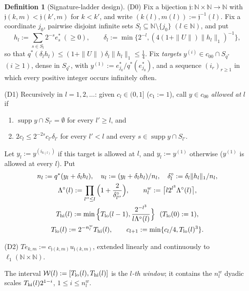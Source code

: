 \documentclass[10pt]{amsart}
\theoremstyle{definition}
\newtheorem{definition}[theorem]{Definition}
\theoremstyle{remark}
\newcommand{\supp}{\operatorname{supp}}
\newcommand{\N}{\mathbb N}
\begin{document}
\begin{definition}[Signature-ladder design]\label{def:SLD}
\textup{(D0)} Fix a bijection $\mathfrak j:\N\times\N\to\N$ with
$\mathfrak j(k,m)<\mathfrak j(k',m)$ for $k<k'$, and write $(k(l),m(l)):=\mathfrak j^{-1}(l)$.
Fix a coordinate $j_0$, pairwise disjoint infinite sets
$S_l\subseteq\N\setminus\{j_0\}$ $(l\in\N)$, and put
\[
 h_l:=\sum_{s\in S_l}2^{-s}e_s^*\ (\ge0),\qquad \delta_l:=\min\big\{2^{-l},
 (4(1+\|U\|)\|h_l\|_1)^{-1}\big\},
\]
so that $q^*(\delta_lh_l)\le(1+\|U\|)\delta_l\|h_l\|_1\le\frac14$.  Fix
\emph{targets} $y^{(i)}\in c_{00}\cap S_{q^*}$ $(i\ge1)$, dense in
$S_{q^*}$, with $y^{(1)}:=e_{j_0}^*/q^*(e_{j_0}^*)$, and a sequence
$(i_r)_{r\ge1}$ in which every positive integer occurs infinitely often.

\textup{(D1)} Recursively in $l=1,2,\dots$: given $c_l\in(0,1]$ ($c_1:=1$),
call $y\in c_{00}$ \emph{allowed at} $l$ if
\begin{enumerate}
\item[(a)] $\supp y\cap S_{l'}=\emptyset$ for every $l'\ge l$, and
\item[(b)] $2c_l\le2^{-2s}c_{l'}\delta_{l'}$ for every $l'<l$ and every
$s\in\supp y\cap S_{l'}$.
\end{enumerate}
Let $y_l:=y^{(i_{k(l)})}$ if this target is allowed at $l$, and
$y_l:=y^{(1)}$ otherwise ($y^{(1)}$ is allowed at every $l$).  Put
\begin{gather*}
 n_l:=q^*(y_l+\delta_lh_l),\quad u_l:=(y_l+\delta_lh_l)/n_l,\quad
 \delta^\circ_l:=\delta_l\|h_l\|_1/n_l,\\
 \Lambda^\circ(l):=\prod_{l''\le l}\Big(1+\frac2{\delta^\circ_{l''}}\Big),\qquad
 n^w_l:=\big\lceil l2^{l^3}\Lambda^\circ(l)\big\rceil,\\
 T_{\rm hi}(l):=\min\Big\{T_{\rm lo}(l-1),\frac{2^{-l^3}}{l\Lambda^\circ(l)}
 \Big\}\ \ (T_{\rm lo}(0):=1),\\
 T_{\rm lo}(l):=2^{-n^w_l}T_{\rm hi}(l),\qquad
 c_{l+1}:=\min\{c_l/4,T_{\rm lo}(l)^3\}.
\end{gather*}

\textup{(D2)} $Te_{k,m}:=c_{\mathfrak j(k,m)}u_{\mathfrak j(k,m)}$, extended linearly and
continuously to $\ell_1(\N\times\N)$.
\end{definition}

The interval $\mathcal W(l):=[T_{\rm lo}(l),T_{\rm hi}(l)]$ is the
\emph{$l$-th window}; it contains the $n^w_l$ dyadic scales
$T_{\rm hi}(l)2^{1-i}$, $1\le i\le n^w_l$.
\end{document}
